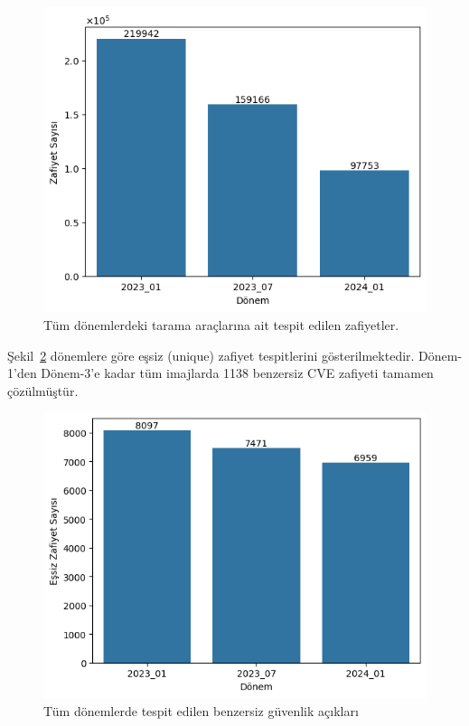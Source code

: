 \begin{figure}
    \centering
    \includegraphics[width=1\linewidth]{images/s2/detected-vulns-by-period.png}
    \caption{Tüm dönemlerdeki tarama araçlarına ait tespit edilen zafiyetler.}\label{fig:detected-vulns-by-period}
\end{figure}

Şekil~\ref{fig:detected-uniq-vulns-by-period} dönemlere göre eşsiz (unique) zafiyet tespitlerini gösterilmektedir. Dönem-1'den Dönem-3'e kadar tüm imajlarda 1138 benzersiz CVE zafiyeti tamamen çözülmüştür.

\begin{figure}
    \centering
    \includegraphics[width=1\linewidth]{images/s2/detected-uniq-vulns-by-period.png}
    \caption{Tüm dönemlerde tespit edilen benzersiz güvenlik açıkları}\label{fig:detected-uniq-vulns-by-period}
\end{figure}

